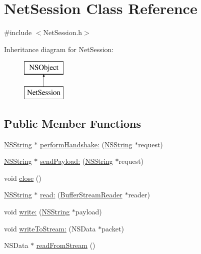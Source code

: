\hypertarget{interface_net_session}{
\section{\-Net\-Session \-Class \-Reference}
\label{interface_net_session}
}


{\ttfamily \#include $<$\-Net\-Session.\-h$>$}

\-Inheritance diagram for \-Net\-Session\-:\begin{figure}[H]
\begin{center}
\leavevmode
\includegraphics[height=2.000000cm]{interface_net_session}
\end{center}
\end{figure}
\subsection*{\-Public \-Member \-Functions}
\begin{DoxyCompactItemize}
\item 
\hyperlink{class_n_s_string}{\-N\-S\-String} $\ast$ \hyperlink{interface_net_session_a7bb9c333fa4588528843d2577984499c}{perform\-Handshake\-:} (\hyperlink{class_n_s_string}{\-N\-S\-String} $\ast$request)
\item 
\hyperlink{class_n_s_string}{\-N\-S\-String} $\ast$ \hyperlink{interface_net_session_a3a71529897ca966e9f9eb7777bd1075d}{send\-Payload\-:} (\hyperlink{class_n_s_string}{\-N\-S\-String} $\ast$request)
\item 
void \hyperlink{interface_net_session_a997806e3229ba5a4f614053f6e1b79ce}{close} ()
\item 
\hyperlink{class_n_s_string}{\-N\-S\-String} $\ast$ \hyperlink{interface_net_session_a172775e7f523e4aeeb715ca86994a7a7}{read\-:} (\hyperlink{interface_buffer_stream_reader}{\-Buffer\-Stream\-Reader} $\ast$reader)
\item 
void \hyperlink{interface_net_session_a37df3e8f8d7f99adc56256cdf0b99984}{write\-:} (\hyperlink{class_n_s_string}{\-N\-S\-String} $\ast$payload)
\item 
void \hyperlink{interface_net_session_a403322c5ba3f458326bb8e2913e9f0e7}{write\-To\-Stream\-:} (\-N\-S\-Data $\ast$packet)
\item 
\-N\-S\-Data $\ast$ \hyperlink{interface_net_session_aa42b4963e5f17ca4f2ce41f30ce8ee51}{read\-From\-Stream} ()
\end{DoxyCompactItemize}

